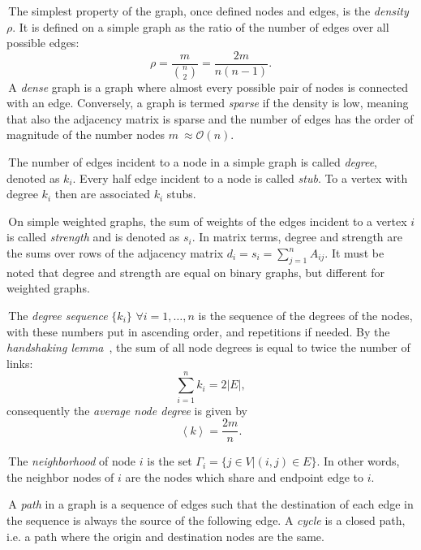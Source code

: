 \noindent\textbullet \,The simplest property of the graph, once defined nodes and edges, is the \emph{density} $\rho$. It is defined on a simple graph as the ratio of the number of edges over all possible edges:
\begin{equation}
\rho = \frac{m}{\binom{n}{2}} = \frac{2m}{n(n-1)}.
\end{equation}
\noindent\textbullet \,A \emph{dense} graph is a graph where almost every possible pair of nodes is connected with an edge. Conversely, a graph is termed \emph{sparse} if the density is low, meaning that also the adjacency matrix is sparse and the number of edges has the order of magnitude of the number nodes $m ~\approx \mathcal{O}(n)$.

\noindent\textbullet \,The number of edges incident to a node in a simple graph is called \emph{degree}, denoted as $k_i$. Every half edge incident to a node is called \emph{stub}. To a vertex with degree $k_i$ then are associated $k_i$ stubs.

\noindent\textbullet \,On simple weighted graphs, the sum of weights of the edges incident to a vertex $i$ is called \emph{strength} and is denoted as $s_i$. 
In matrix terms, degree and strength are the sums over rows of the adjacency matrix $d_i=s_i=\sum_{j=1}^n A_{ij}$. It must be noted that degree and strength are equal on binary graphs, but different for weighted graphs.

\noindent\textbullet \,The \emph{degree sequence} $\{k_i\}$ $\forall i=1,\ldots,n$ is the sequence  of the degrees of the nodes, with these numbers put in ascending order, and repetitions if needed. By the \emph{handshaking lemma}~\cite{leiserson2001}, the sum of all node degrees is equal to twice the number of links:
\begin{equation}
\label{eq:handshaking_lemma}
\sum_{i=1}^n k_i=2 |E|,
\end{equation}
consequently the \emph{average node degree} is given by
\begin{equation}
\left< k \right> = \frac{2m}{n}.
\end{equation}

\noindent\textbullet \,The \emph{neighborhood} of node $i$ is the set $\Gamma_i=\{j \in V | (i,j) \in E \}$. In other words, the neighbor nodes of $i$ are the nodes which share and endpoint edge to $i$. 

\noindent\textbullet \,A \emph{path} in a graph is a sequence of edges such that the destination of each edge in the sequence is always the source of the following edge. A \emph{cycle} is a closed path, i.e. a path where the origin and destination nodes are the same.

